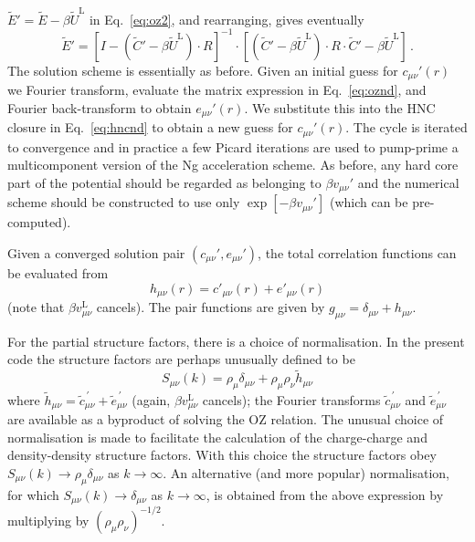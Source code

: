 \documentclass[12pt,a4paper]{article}
\newcommand{\lr}{^{\mathrm{L}}}
\newcommand{\myprime}{^{{}\,\prime}}
\newcommand{\Eqref}[1]{Eq.~\eqref{#1}}
\begin{document}
${\tilde E}'={\tilde E}-\beta{\tilde U}\lr$ in \Eqref{eq:oz2}, and
rearranging, gives eventually
%
\begin{equation}
{\tilde E}'=[I-({\tilde C}'-\beta{\tilde U}\lr)\cdot R]^{-1}\cdot
[({\tilde C}'-\beta{\tilde U}\lr)\cdot R\cdot {\tilde C}'-\beta{\tilde
    U}\lr]\,.
\label{eq:oznd}
\end{equation}
%
The solution scheme is essentially as before.  Given an initial guess
for $c_{\mu\nu}'(r)$ we Fourier transform, evaluate the matrix
expression in \Eqref{eq:oznd}, and Fourier back-transform to obtain
$e_{\mu\nu}'(r)$.  We substitute this into the HNC closure in
\Eqref{eq:hncnd} to obtain a new guess for $c_{\mu\nu}'(r)$.  The
cycle is iterated to convergence and in practice a few Picard
iterations are used to pump-prime a multicomponent version of the Ng
acceleration scheme.  As before, any hard core part of the potential
should be regarded as belonging to $\beta v_{\mu\nu}'$ and the
numerical scheme should be constructed to use only $\exp[-\beta
  v_{\mu\nu}']$ (which can be pre-computed).

Given a converged solution pair $(c_{\mu\nu}', e_{\mu\nu}')$, the
total correlation functions can be evaluated from
%
\begin{equation}
h_{\mu\nu}(r) = c'_{\mu\nu}(r) +  e'_{\mu\nu}(r)\label{eq:hrs}
\end{equation}
%
(note that $\beta v_{\mu\nu}\lr$ cancels).  The pair functions are
given by $g_{\mu\nu}=\delta_{\mu\nu}+h_{\mu\nu}$.

For the partial structure factors, there is a choice of normalisation.
In the present code the structure factors are perhaps unusually
defined to be
%
\begin{equation}
S_{\mu\nu}(k) = \rho_\mu\delta_{\mu\nu} + \rho_\mu\rho_\nu{\tilde
  h}_{\mu\nu}
\label{eq:skdef}
\end{equation}
%
where ${\tilde h}_{\mu\nu}={\tilde c}_{\mu\nu}\myprime + {\tilde
  e}_{\mu\nu}\myprime$ (again, $\beta v_{\mu\nu}\lr$ cancels); the
Fourier transforms ${\tilde c}_{\mu\nu}\myprime$ and ${\tilde
  e}_{\mu\nu}\myprime$ are available as a byproduct of solving the OZ
relation.  The unusual choice of normalisation is made to facilitate
the calculation of the charge-charge and density-density structure
factors.  With this choice the structure factors obey
$S_{\mu\nu}(k)\to\rho_\mu\delta_{\mu\nu}$ as $k\to\infty$.  An
alternative (and more popular) normalisation, for which
$S_{\mu\nu}(k)\to\delta_{\mu\nu}$ as $k\to\infty$, is obtained from
the above expression by multiplying by $({\rho_\mu\rho_\nu})^{-1/2}$.
\end{document}
